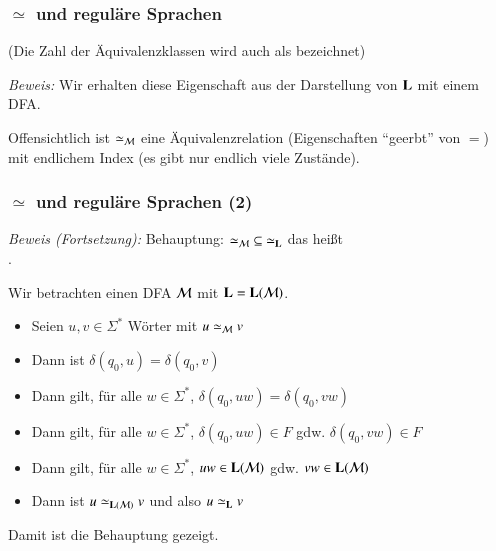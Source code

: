 \documentclass[aspectratio=1610,onlymath]{beamer}
\begin{document}


\begin{frame}[t]\frametitle{$\simeq$ und reguläre Sprachen}

(Die Zahl der Äquivalenzklassen wird auch als  bezeichnet)\medskip\pause

\emph{Beweis:} Wir erhalten diese Eigenschaft aus der Darstellung von $\textbf{\textcolor{black}{L}}$ mit einem DFA.


Offensichtlich ist $\simeq_{\mathcal{M}}$ eine Äquivalenzrelation (Eigenschaften "`geerbt"' von $=$) mit endlichem Index (es gibt nur endlich viele Zustände).
\medskip


\end{frame}

\begin{frame}[t]\frametitle{$\simeq$ und reguläre Sprachen (2)}


\emph{Beweis (Fortsetzung):} 
Behauptung: ${\simeq_{\mathcal{M}}}\subseteq {\simeq_{\textbf{\textcolor{black}{L}}}}$ das heißt\\[1ex]
% 
.\medskip

Wir betrachten einen DFA $\mathcal{M}$ mit $\textbf{\textcolor{black}{L}}=\textbf{\textcolor{black}{L}}(\mathcal{M})$.\pause
\begin{itemize}
\item Seien $u,v\in\Sigma^*$ Wörter mit $u \simeq_{\mathcal{M}} v$\pause
\item Dann ist $\delta(q_0,u)=\delta(q_0,v)$\pause
\item Dann gilt, für alle $w\in\Sigma^*$, $\delta(q_0,uw)=\delta(q_0,vw)$\pause
\item Dann gilt, für alle $w\in\Sigma^*$, $\delta(q_0,uw)\in F$ gdw. $\delta(q_0,vw)\in F$\pause
\item Dann gilt, für alle $w\in\Sigma^*$, $uw\in \textbf{\textcolor{black}{L}}(\mathcal{M})$ gdw. $vw\in \textbf{\textcolor{black}{L}}(\mathcal{M})$\pause
\item Dann ist $u \simeq_{\textbf{\textcolor{black}{L}}(\mathcal{M})} v$ und also $u \simeq_{\textbf{\textcolor{black}{L}}} v$
\end{itemize}
Damit ist die Behauptung gezeigt.

\end{frame}
\end{document}
